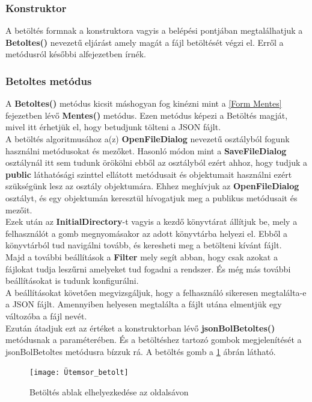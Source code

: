 \documentclass[tocnopagenum]{thesis-ekf}
\theoremstyle{definition}
\theoremstyle{remark}
\begin{document}
	\subsubsection{Konstruktor}
	A betöltés formnak a konstruktora vagyis a belépési pontjában megtalálhatjuk a \textbf{Betoltes()} nevezetű eljárást amely magát a fájl betöltését végzi el. Erről a metódusról későbbi alfejezetben írnék.
	\subsubsection{Betoltes metódus}
	A \textbf{Betoltes()} metódus kicsit máshogyan fog kinézni mint a \ref{Form Mentes} fejezetben lévő \textbf{Mentes()} metódus. Ezen metódus képezi a Betöltés magját, mivel itt érhetjük el, hogy betudjunk tölteni a JSON fájlt.
	\\
	A betöltés algoritmusához a(z) \textbf{OpenFileDialog} nevezetű osztályból fogunk használni metódusokat és mezőket. Hasonló módon mint a \textbf{SaveFileDialog} osztálynál itt sem tudunk örökölni ebből az osztályból ezért ahhoz, hogy tudjuk a \textbf{public} láthatósági szinttel ellátott metódusait és objektumait használni ezért szükségünk lesz az osztály objektumára.
	Ehhez meghívjuk az \textbf{OpenFileDialog} osztályt, és egy objektumán keresztül hívogatjuk meg a publikus metódusait és mezőit.
	\\
	Ezek után az \textbf{InitialDirectory}-t vagyis a kezdő könyvtárat állítjuk be, mely a felhasználót a gomb megnyomásakor az adott könyvtárba helyezi el. Ebből a könyvtárból tud navigálni tovább, és keresheti meg a betölteni kívánt fájlt. 
	\\
	Majd a további beállítások a \textbf{Filter} mely segít abban, hogy csak azokat a fájlokat tudja leszűrni amelyeket tud fogadni a rendszer.
	És még más további beállításokat is tudunk konfigurálni.
	\\
	A beállításokat követően megvizsgáljuk, hogy a felhasználó sikeresen  megtalálta-e a JSON fájlt. Amennyiben helyesen megtalálta a fájlt utána elmentjük egy változóba a fájl nevét.
	\\
	Ezután átadjuk ezt az értéket a konstruktorban lévő \textbf{jsonBolBetoltes()} metódusnak a paraméterében.
	És a betöltéshez tartozó gombok megjelenítését a jsonBolBetoltes metódusra bízzuk rá.
	A betöltés gomb a \ref{fig:betoltesgomb} ábrán látható.
	\begin{figure}[H]	
		\centering
		\texttt{[image: Ütemsor\_betolt]}
		\caption[Betöltés ablak elhelyezkedése az oldalsávon]{Betöltés ablak elhelyezkedése az oldalsávon}
		\label{fig:betoltesgomb}
	\end{figure}
	
\end{document}
